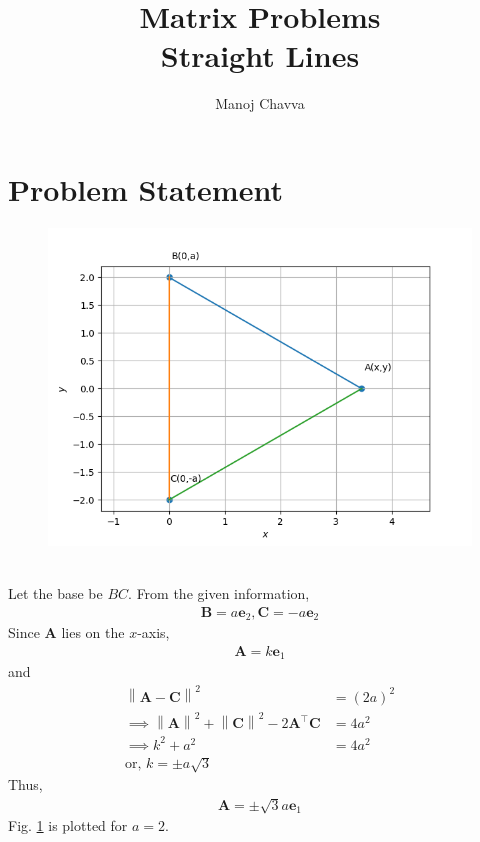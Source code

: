 \documentclass[journal,12pt,twocolumn]{IEEEtran}
\title{Matrix Problems \textbf{\\Straight Lines }}
\author{Manoj Chavva}
\providecommand{\norm}[1]{\left\lVert#1\right\rVert}
\let\vec\mathbf
\providecommand{\brak}[1]{\ensuremath{\left(#1\right)}}
\begin{document}
\maketitle



\section{Problem Statement}

\noindent 
\fi
	\begin{figure}[!ht]
		\centering
 \includegraphics[width=\columnwidth]{chapters/11/10/1/2/figs/triangle.png}
		\caption{}
		\label{fig:11/10/1/2}
  	\end{figure}
	\\
	\solution Let the base be $BC$.  From the given information, 
\begin{align}
	\vec{B} = a\vec{e}_2,
	\vec{C} = -a\vec{e}_2
\end{align}
Since $\vec{A}$ lies on the $x$-axis, 
\begin{align}
	\vec{A} = k\vec{e}_1
\end{align}
and 
\begin{align}
	\norm{\vec{A}-\vec{C}}^2 &= \brak{2a}^2
	\\
	\implies \norm{\vec{A}}^2+\norm{\vec{C}}^2 - 2 \vec{A}^{\top}\vec{C} &= 4a^2
	\\
	\implies k^2 +a^2 &= 4a^2
	\\
	\text{or, } k = \pm a\sqrt{3}
\end{align}
Thus, 
\begin{align}
	\vec{A} = \pm \sqrt{3}a\vec{e}_1
\end{align}
		Fig. \ref{fig:11/10/1/2}
		is plotted for $a = 2$.
\end{document}
